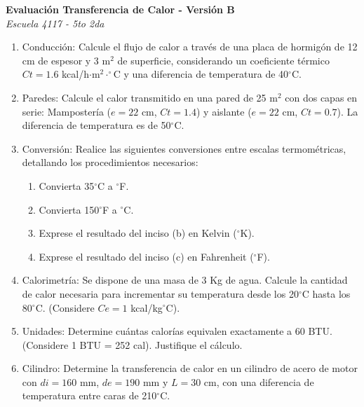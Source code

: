 \documentclass[a4paper,10pt]{article}
\newenvironment{versionexamen}[1]{
  \begin{minipage}[t]{0.48\textwidth}
    \textbf{Evaluación Transferencia de Calor - Versión #1} \\
    \textit{Escuela 4117 - 5to 2da}
    \begin{enumerate}[label=\textbf{\arabic*.}, leftmargin=15pt, topsep=4pt, itemsep=4pt]
      \small
}{
    \end{enumerate}
    \vspace{0.4cm}
  \end{minipage}
}
\begin{document}
\begin{versionexamen}{B}
	\item Conducción: Calcule el flujo de calor a través de una placa de hormigón de 12 cm de espesor y 3 m$^2$ de superficie, considerando un coeficiente térmico $Ct=1.6$ kcal/h$\cdot$m$^2\cdot^\circ$C y una diferencia de temperatura de 40$^\circ$C.
	\item Paredes: Calcule el calor transmitido en una pared de 25 m$^2$ con dos capas en serie: Mampostería ($e=22$ cm, $Ct=1.4$) y aislante ($e=22$ cm, $Ct=0.7$). La diferencia de temperatura es de 50$^\circ$C.
	\item Conversión: Realice las siguientes conversiones entre escalas termométricas, detallando los procedimientos necesarios:
	\begin{enumerate}[label=\alph*., nosep, leftmargin=15pt]
		\item Convierta 35$^\circ$C a $^\circ$F.
		\item Convierta 150$^\circ$F a $^\circ$C.
		\item Exprese el resultado del inciso (b) en Kelvin ($^\circ$K).
		\item Exprese el resultado del inciso (c) en Fahrenheit ($^\circ$F).
	\end{enumerate}
	\item Calorimetría: Se dispone de una masa de 3 Kg de agua. Calcule la cantidad de calor necesaria para incrementar su temperatura desde los 20$^\circ$C hasta los 80$^\circ$C. (Considere $Ce=1$ kcal/kg$^\circ$C).
	\item Unidades: Determine cuántas calorías equivalen exactamente a 60 BTU. (Considere 1 BTU = 252 cal). Justifique el cálculo.
	\item Cilindro: Determine la transferencia de calor en un cilindro de acero de motor con $di=160$ mm, $de=190$ mm y $L=30$ cm, con una diferencia de temperatura entre caras de 210$^\circ$C.
\end{versionexamen}
\vfill
\end{document}
